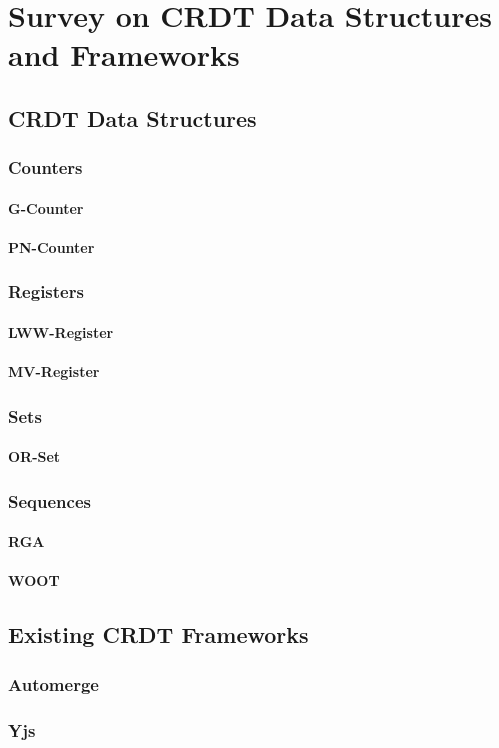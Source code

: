 \chapter{Survey on CRDT Data Structures and Frameworks}

\section{CRDT Data Structures}

\subsection{Counters}

\subsubsection{G-Counter}

\subsubsection{PN-Counter}

\subsection{Registers}

\subsubsection{LWW-Register}

\subsubsection{MV-Register}

\subsection{Sets}

\subsubsection{OR-Set}

\subsection{Sequences}

\subsubsection{RGA}

\subsubsection{WOOT}

\section{Existing CRDT Frameworks}

\subsection{Automerge}

\subsection{Yjs}